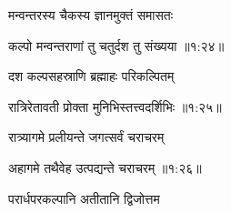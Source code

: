 {\devanagarifont मन्वन्तरस्य चैकस्य ज्ञानमुक्तं समासतः \thinspace{\dandab} \dontdisplaylinenum }%


{\devanagarifont कल्पो मन्वन्तराणां तु चतुर्दश तु संख्यया {॥१:२४॥} \veg\dontdisplaylinenum }%

{\devanagarifont दश कल्पसहस्राणि ब्रह्माहः परिकल्पितम् \thinspace{\dandab} \dontdisplaylinenum }%


{\devanagarifont रात्रिरेतावती प्रोक्ता मुनिभिस्तत्त्वदर्शिभिः {॥१:२५॥} \veg\dontdisplaylinenum }%

\vfill
\pageparbreak
\vers

{\devanagarifont रात्र्यागमे प्रलीयन्ते जगत्सर्वं चराचरम् \thinspace{\dandab} \dontdisplaylinenum }%


{\devanagarifont अहागमे तथैवेह उत्पद्यन्ते चराचरम् {॥१:२६॥} \veg\dontdisplaylinenum }%

{\devanagarifont परार्धपरकल्पानि अतीतानि द्विजोत्तम \thinspace{\dandab} \dontdisplaylinenum }%

